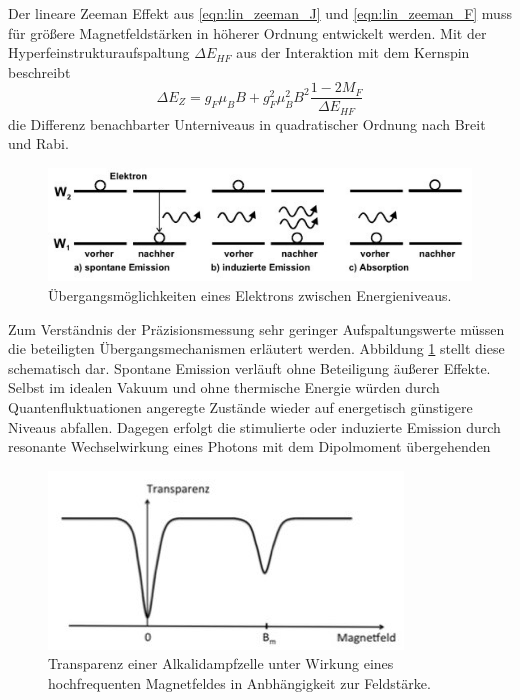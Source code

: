 Der lineare Zeeman Effekt aus \eqref{eqn:lin_zeeman_J} und \eqref{eqn:lin_zeeman_F} muss für größere Magnetfeldstärken
in höherer Ordnung entwickelt werden. Mit der Hyperfeinstrukturaufspaltung $\Delta E_{HF}$ aus der Interaktion mit dem Kernspin
beschreibt
\begin{equation}
	\Delta E_Z = g_F \mu_B B + g_F^2 \mu_B^2 B^2 \frac{1 - 2M_F}{\Delta E_{HF}}
	\label{eqn:quad_zeeman}
\end{equation}
die Differenz benachbarter Unterniveaus in quadratischer Ordnung nach Breit und Rabi.

\begin{figure}[H]
	\centering
	\includegraphics[width=0.75\linewidth]{content/grafik/uebergang.jpg}
	\caption{Übergangsmöglichkeiten eines Elektrons zwischen Energieniveaus. \cite{pumpen}}
	\label{fig:uebergang}
\end{figure}

Zum Verständnis der Präzisionsmessung sehr geringer Aufspaltungswerte müssen die beteiligten Übergangsmechanismen erläutert werden.
Abbildung \ref{fig:uebergang} stellt diese schematisch dar. Spontane Emission verläuft ohne Beteiligung äußerer Effekte. Selbst im
idealen Vakuum und ohne thermische Energie würden durch Quantenfluktuationen angeregte Zustände wieder auf energetisch günstigere
Niveaus abfallen. Dagegen erfolgt die stimulierte oder induzierte Emission durch resonante Wechselwirkung eines Photons mit dem
Dipolmoment übergehenden

\begin{figure}[H]
	\centering
	\includegraphics[width=0.6\linewidth]{content/grafik/minima.jpg}
	\caption{Transparenz einer Alkalidampfzelle unter Wirkung eines hochfrequenten Magnetfeldes in Anbhängigkeit
			 zur Feldstärke. \cite{pumpen}}
	\label{fig:minima}
\end{figure}

